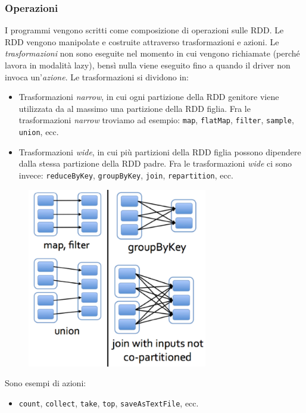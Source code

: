 \documentclass[titlepage]{article}
\begin{document}
\subsubsection{Operazioni}
I programmi vengono scritti come composizione di operazioni sulle RDD. Le RDD vengono manipolate e costruite attraverso trasformazioni e azioni. Le \textit{trasformazioni} non sono eseguite nel momento in cui vengono richiamate (perché lavora in modalità lazy), bensì nulla viene eseguito fino a quando il driver non invoca un'\textit{azione}. Le trasformazioni si dividono in:
\begin{itemize}
    \item Trasformazioni \textit{narrow}, in cui ogni partizione della RDD genitore viene utilizzata da al massimo una partizione della RDD figlia. Fra le trasformazioni \textit{narrow} troviamo ad esempio: \texttt{map}, \texttt{flatMap}, \texttt{filter}, \texttt{sample}, \texttt{union}, ecc.
    
    \item Trasformazioni \textit{wide}, in cui più partizioni della RDD figlia possono dipendere dalla stessa partizione della RDD padre. Fra le trasformazioni \textit{wide} ci sono invece: \texttt{reduceByKey}, \texttt{groupByKey}, \texttt{join}, \texttt{repartition}, ecc.
\end{itemize}
\newpage
\begin{figure}[htp]
	\centering
	\includegraphics[width=0.7\textwidth]{trasformazioni.png}
\end{figure}

\noindent
Sono esempi di azioni:
\begin{itemize}
    \item \texttt{count}, \texttt{collect}, \texttt{take}, \texttt{top}, \texttt{saveAsTextFile}, ecc.
\end{itemize}
\end{document}
